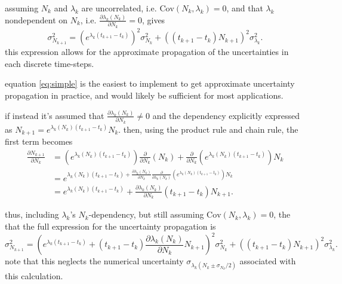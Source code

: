 \documentclass[a4paper]{article}
\begin{document}
assuming $N_k$ and $\lambda_k$ are uncorrelated, i.e. $\text{Cov}\left(N_k,\lambda_k\right)=0$, and that $\lambda_k$ nondependent on $N_k$, i.e. $\frac{\partial \lambda_k(N_k)}{\partial N_k}=0$, gives
\begin{equation}
  \label{eq:simple}
  \sigma_{N_{k+1}}^2
  =\left(e^{\lambda_k(t_{k+1}-t_k)}\right)^2 \sigma_{N_k}^2
  +\left((t_{k+1}-t_k)N_{k+1}\right)^2 \sigma_{\lambda_k}^2.
\end{equation}
this expression allows for the approximate propagation of the uncertainties in each discrete time-steps.

equation \ref{eq:simple} is the easiest to implement to get approximate uncertainty propagation in practice, and would likely be sufficient for most applications.

if instead it's assumed that $\frac{\partial \lambda_k(N_k)}{\partial N_k}\neq 0$ and the dependency explicitly expressed as $N_{k+1}=e^{\lambda_k(N_k)(t_{k+1}-t_k)}N_k$.
then, using the product rule and chain rule, the first term becomes
\begin{equation}
  \begin{split}
	\frac{\partial N_{k+1}}{\partial N_k}
	&=(e^{\lambda_k(N_k)(t_{k+1}-t_k)})\frac{\partial }{\partial N_k}\left(N_k\right)+\frac{\partial }{\partial N_k}\left(e^{\lambda_k(N_k)(t_{k+1}-t_k)}\right)N_k \\
	&=e^{\lambda_k(N_k)(t_{k+1}-t_k)+\frac{\partial \lambda_k(N_k)}{\partial N_k}\frac{\partial}{\partial \lambda_k(N_k)}\left(e^{\lambda_k(N_k)(t_{k+1}-t_k)}\right)N_k} \\
	&=e^{\lambda_k(N_k)(t_{k+1}-t_k)}+\frac{\partial \lambda_k(N_k)}{\partial N_k} (t_{k+1}-t_k) N_{k+1}.
  \end{split}
\end{equation}

thus, including $\lambda_k$'s $N_k$-dependency, but still assuming $\text{Cov}\left(N_k,\lambda_k\right)=0$, the that the full expression for the uncertainty propagation is
\begin{equation}
  \label{eq:full}
  \sigma_{N_{k+1}}^2
  =\left(e^{\lambda_k(t_{k+1}-t_k)}+(t_{k+1}-t_k)\frac{\partial \lambda_k(N_k)}{\partial N_k}N_{k+1}\right)^2 \sigma_{N_k}^2
  +\left((t_{k+1}-t_k)N_{k+1}\right)^2 \sigma_{\lambda_k}^2.
\end{equation}
note that this neglects the numerical uncertainty $\sigma_{\lambda_k(N_k\pm\sigma_{N_k}/2)}$ associated with this calculation.
\end{document}
